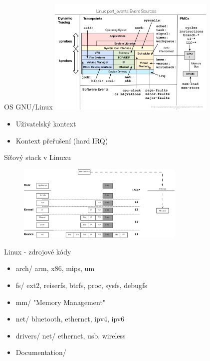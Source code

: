 \documentclass{beamer}
\begin{document}
\begin{frame}{OS GNU/Linux}
	\centering
	\includegraphics[width=8cm,keepaspectratio]{fig/perf_events_map.png}
	\begin{itemize}
		\item Uživatelský kontext
		\item Kontext přeřušení (hard IRQ)
	\end{itemize}
\end{frame}

\begin{frame}{Síťový stack v Linuxu}
	\begin{figure}
		\centering
		\includegraphics[width=8cm,keepaspectratio]{fig/layers.png}
	\end{figure}
\end{frame}

\begin{frame}{Linux - zdrojové kódy}
	\begin{itemize}
		\item arch/ arm, x86, mips, um
		\item fs/ ext2, reiserfs, btrfs, proc, sysfs, debugfs
		\item mm/ "Memory Management"
		\item net/ bluetooth, ethernet, ipv4, ipv6
		\item drivers/ net/ ethernet, usb, wireless 
		\item Documentation/
	\end{itemize}
\end{frame}
\end{document}
